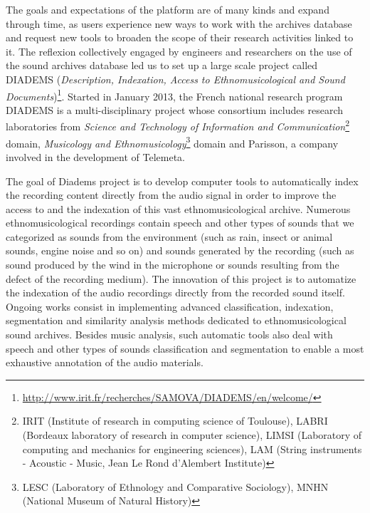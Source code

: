 \documentclass{sig-alternate}
\newcommand{\comment}[1]{\footnote{\color{red} \bf{{#1}}}}
\begin{document}
The goals and expectations of the platform are of many kinds and expand through time, as users experience new ways to work with the archives database and request new tools to broaden the scope of their research activities linked to it. The reflexion collectively engaged by engineers and researchers on the use of the sound archives database led us  to set up a large scale project called DIADEMS (\emph{Description, Indexation, Access to Ethnomusicological and Sound Documents})\footnote{\url{http://www.irit.fr/recherches/SAMOVA/DIADEMS/en/welcome/}}. 
Started in January 2013, the French national research program DIADEMS is a multi-disciplinary project whose consortium includes research laboratories from \emph{ Science and Technology of Information and Communication}\footnote{IRIT (Institute of research in computing science of Toulouse), LABRI (Bordeaux laboratory of research in computer science), LIMSI (Laboratory of computing and mechanics for engineering sciences), LAM (String instruments - Acoustic - Music, Jean Le Rond d'Alembert Institute)} domain, \emph{Musicology and Ethnomusicology}\footnote{LESC (Laboratory of Ethnology and Comparative Sociology), MNHN (National Museum of Natural History)} domain and Parisson, a company involved in the development of Telemeta.
 
The goal of Diadems project is to develop computer tools to automatically index the recording content directly from the audio signal in order to improve the access to and the indexation of this vast ethnomusicological archive. Numerous ethnomusicological recordings contain speech and other types of sounds that we categorized as sounds from the environment (such as rain, insect or animal sounds, engine noise and so on) and sounds generated by the recording (such as sound produced by the wind in the microphone or sounds resulting from the defect of the recording medium). The innovation of this project is to automatize the indexation of the audio recordings directly from the recorded sound itself. Ongoing works consist in implementing advanced classification, indexation, segmentation and similarity analysis methods dedicated to ethnomusicological sound archives.  Besides music analysis, such automatic tools also deal with speech and other types of sounds classification and segmentation to enable a most exhaustive annotation of the audio materials.
\end{document}
